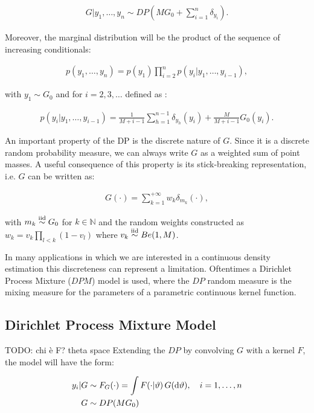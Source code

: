 \begin{align}
	G | y_1,\dots,y_n \sim DP(M G_0 + \sum_{i=1}^n \delta_{y_i}) .
\end{align}

Moreover, the marginal distribution will be the product of the sequence of increasing conditionals:

\begin{align}
	p(y_1,\dots,y_n)= p(y_1)\prod\limits_{i=2}^{n} p(y_i|y_1,\dots,y_{i-1}),
\end{align}

with $y_1 \sim G_0$ and for $i=2,3,\dots$ defined as :

\begin{align}
	p(y_i|y_1,\dots,y_{i-1})= \frac{1}{M+i-1}\sum_{h=1}^{n-1} \delta_{y_h}(y_i) +\frac{M}{M+i-1} G_0(y_i).
\end{align}

An important property of the DP is the discrete nature of $G$. Since it is a discrete
random probability measure, we can always write $G$ as a weighted sum of point masses.
A useful consequence of this property is its stick-breaking representation, i.e. $G$ can be written as:

\begin{align}
 G(\cdot) = \sum_{k=1}^{+\infty} w_k \delta_{m_k} (\cdot),
 \end{align}
 
with $m_k \stackrel{\text{iid}}{\sim} G_0$ for $k\in\mathbb{N}$ and the random weights constructed as $w_k =v_k\prod\limits_{l<k} (1-v_l)$ where $v_k \stackrel{\text{iid}}{\sim} Be(1,M)$.




In many applications in which we are interested in a continuous density estimation this discreteness can represent a limitation.
 Oftentimes a Dirichlet Process Mixture ($DPM$) model is used, where  the $DP$ random measure is the mixing measure for the parameters of a parametric continuous kernel function.


\subsection{Dirichlet Process Mixture Model}
TODO: chi è F? theta space
Extending the $DP$ by convolving $G$ with a kernel $F$, the model will have the form:

\begin{align}
			y_i | G &\sim F_G(\cdot) = \int F(\cdot | \vartheta) \, G(\mathrm d\vartheta), \quad i=1,\dots,n \\
			G &\sim DP(M G_0) \nonumber
\end{align}


